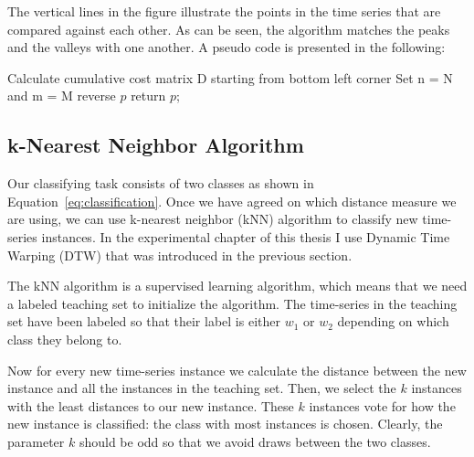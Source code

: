 The vertical lines in the figure illustrate the points in the time series that are compared against each other. As can be seen, the algorithm matches the peaks and the valleys with one another. A pseudo code is presented in the following:


\begin{algorithm}[H]
	Calculate cumulative cost matrix D starting from bottom left corner\;
	Set n = N and m = M\;
	reverse $p$\;
	return $p$;
\end{algorithm}


\subsection{k-Nearest Neighbor Algorithm}
Our classifying task consists of two classes as shown in Equation~\ref{eq:classification}. Once we have agreed on which distance measure we are using, we can use k-nearest neighbor (kNN) algorithm to classify new time-series instances. In the experimental chapter of this thesis I use Dynamic Time Warping (DTW) that was introduced in the previous section.

The kNN algorithm is a supervised learning algorithm, which means that we need a labeled teaching set to initialize the algorithm. \cite{PatternRecognition} The time-series in the teaching set have been labeled so that their label is either $w_1$ or $w_2$ depending on which class they belong to. 

Now for every new time-series instance we calculate the distance between the new instance and all the instances in the teaching set. Then, we select the $k$ instances with the least distances to our new instance. These $k$ instances vote for how the new instance is classified: the class with most instances is chosen. Clearly, the parameter $k$ should be odd so that we avoid draws between the two classes. \cite{Hastie08}


